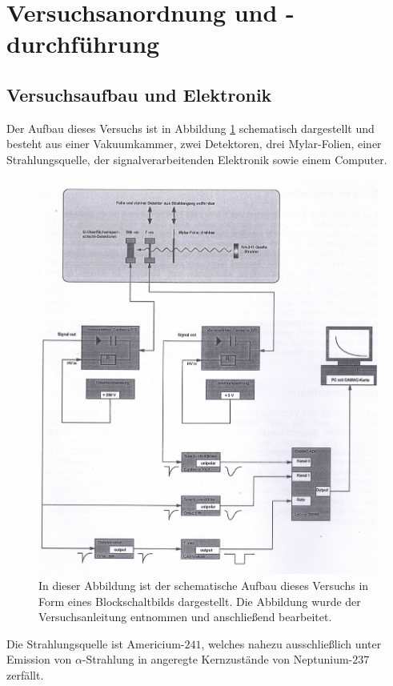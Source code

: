 \section{Versuchsanordnung und -durchführung}

\subsection{Versuchsaufbau und Elektronik} \label{AufbauElektronik}

Der Aufbau dieses Versuchs ist in Abbildung \ref{Aufbau} schematisch dargestellt und besteht aus einer Vakuumkammer, zwei Detektoren, drei Mylar-Folien, einer Strahlungsquelle, der signalverarbeitenden Elektronik sowie einem Computer.
\begin{figure}[H]
	\centering
	\includegraphics[width=1.0\textwidth]{img/Aufbau}
	\caption{In dieser Abbildung ist der schematische Aufbau dieses Versuchs in Form eines Blockschaltbilds dargestellt. Die Abbildung wurde der Versuchsanleitung\cite{wwu} entnommen und anschließend bearbeitet.}
	\label{Aufbau}
\end{figure}
\noindent Die Strahlungsquelle ist Americium-$241$, welches nahezu ausschließlich unter Emission von $\alpha$-Strahlung in angeregte Kernzustände von Neptunium-$237$ zerfällt.
